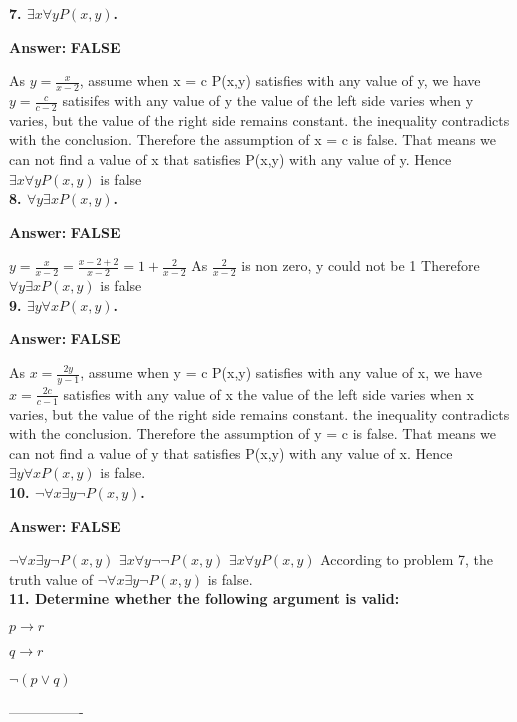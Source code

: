 \documentclass{article}
\begin{document}
\begin{large}
\textbf{7. $\exists x \forall yP(x,y)$.}

\textbf{Answer:}   \textbf{FALSE}



As $y = \frac{x}{x-2}$, 
assume when x = c P(x,y) satisfies with any value of y, 
we have $y = \frac{c}{c-2}$ satisifes with any value of y
the value of the left side varies when y varies, 
but the value of the right side remains constant.
the inequality contradicts with the conclusion.
Therefore the assumption of x = c is false.
That means we can not find a value of x that satisfies P(x,y) with any value of y.
Hence $\exists x \forall yP(x,y)$ is false\\

\textbf{8. $\forall y \exists xP(x,y)$.}

\textbf{Answer:}   \textbf{FALSE}

$y = \frac{x}{x-2} = \frac{x-2+2}{x-2} = 1 + \frac{2}{x-2}$ 
As $\frac{2}{x-2}$ is non zero, y could not be 1
Therefore $\forall y \exists xP(x,y)$ is false\\

\textbf{9. $\exists y \forall xP(x,y)$.}

\textbf{Answer:}   \textbf{FALSE}

As $x = \frac{2y}{y-1}$, 
assume when y = c P(x,y) satisfies with any value of x,
we have $x = \frac{2c}{c-1}$ satisfies with any value of x
the value of the left side varies when x varies,
but the value of the right side remains constant.
the inequality contradicts with the conclusion.
Therefore the assumption of y = c is false.
That means we can not find a value of y that satisfies P(x,y) with any value of x.
Hence $\exists y \forall xP(x,y)$ is false.\\

\textbf{10. $\lnot \forall x \exists y \lnot P(x,y)$.}

\textbf{Answer:} \textbf{FALSE}


$\lnot \forall x \exists y \lnot P(x,y)$
$\exists x \forall y \lnot \lnot P(x,y)$
$\exists x \forall y P(x,y)$
According to problem 7, the truth value of $\lnot \forall x \exists y \lnot P(x,y)$ is false.\\


\textbf{11. Determine whether the following argument is valid:}

\textbf{$p \to r$}

\textbf{$q \to r$}

\textbf{$\lnot (p \lor q)$}

----------------


\end{large}
\end{document}
